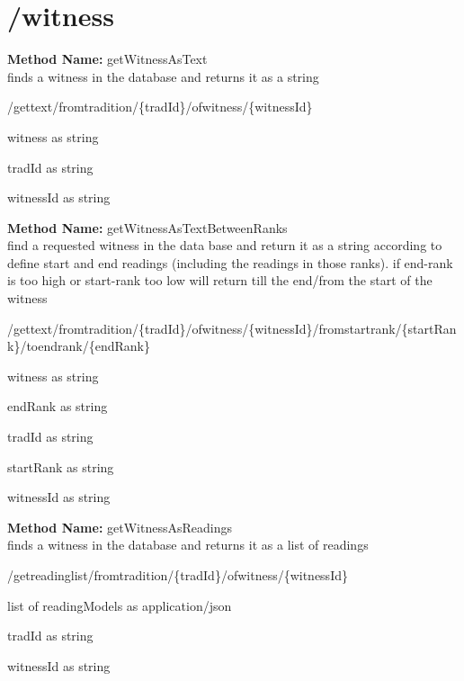 \section{/witness}
\textbf{Method Name: }getWitnessAsText \\ finds a witness in the database and returns it as a string
\begin{get}
/gettext/fromtradition/\{tradId\}/ofwitness/\{witnessId\}
\end{get}
\begin{response}
witness as string
\end{response}
\begin{parameter}
tradId as string
\end{parameter}
\begin{parameter}
witnessId as string
\end{parameter}
\textbf{Method Name: }getWitnessAsTextBetweenRanks \\ find a requested witness in the data base and return it as a string according to define start and end readings (including the readings in those ranks). if end-rank is too high or start-rank too low will return till the end/from the start of the witness
\begin{get}
/gettext/fromtradition/\{tradId\}/ofwitness/\{witnessId\}/fromstartrank/\{startRank\}/toendrank/\{endRank\}
\end{get}
\begin{response}
witness as string
\end{response}
\begin{parameter}
endRank as string
\end{parameter}
\begin{parameter}
tradId as string
\end{parameter}
\begin{parameter}
startRank as string
\end{parameter}
\begin{parameter}
witnessId as string
\end{parameter}
\textbf{Method Name: }getWitnessAsReadings \\ finds a witness in the database and returns it as a list of readings
\begin{get}
/getreadinglist/fromtradition/\{tradId\}/ofwitness/\{witnessId\}
\end{get}
\begin{response}
list of readingModels as application/json
\end{response}
\begin{parameter}
tradId as string
\end{parameter}
\begin{parameter}
witnessId as string
\end{parameter}
